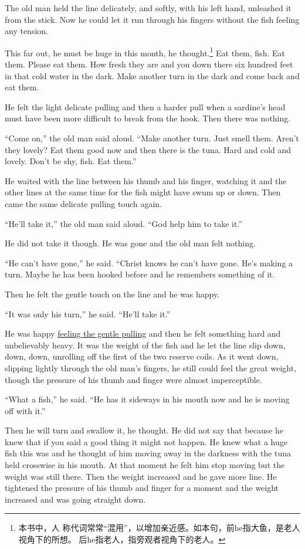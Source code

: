 \documentclass[fontset=ubuntu]{ctexrep}
\begin{document}
The old man held the line delicately, and softly, with his left hand,
\gls{unleashed} it from the stick. Now he could let it run through his
fingers without the fish feeling any \gls{tension}.

This far out, he must be huge in this month, he thought.\footnote{本书中，人
  称代词常常“混用”，以增加亲近感。如本句，前he指大鱼，是老人视角下的所想。
  后he指老人，指旁观者视角下的老人。} Eat them, fish. Eat them. Please eat
them. How fresh they are and you down there six hundred feet in that cold
water in the dark. Make another turn in the dark and come back and eat them.

He felt the light delicate pulling and then a harder pull when a sardine's
head must have been more difficult to break from the hook. Then there was
nothing.

``Come on,'' the old man said aloud. ``Make another turn. Just smell them.
Aren't they lovely? Eat them good now and then there is the tuna. Hard and
cold and lovely. Don't be shy, fish. Eat them.''

He waited with the line between his thumb and his finger, watching it and
the other lines at the same time for the fish might have swum up or down.
Then came the same delicate pulling touch again.

``He'll take it,'' the old man said aloud. ``God help him to take it.''

He did not take it though. He was gone and the old man felt nothing.

``He can't have gone,'' he said. ``\gls{Christ} knows he can't have gone. He's
making a turn. Maybe he has been hooked before and he remembers something of
it.

Then he felt the \gls{gentle} touch on the line and he was happy.

``It was only his turn,'' he said. ``He'll take it.''

He was happy \uline{feeling the gentle pulling} and then he felt something hard
and unbelievably heavy. It was the weight of the fish and he let the line
\gls{slip} down, down, down, \gls{unrolling} off the first of the two
\gls{reserve} coils. As it went down, slipping lightly through the old man's
fingers, he still could feel the great weight, though the \gls{pressure} of
his thumb and finger were almost \gls{imperceptible}.

``What a fish,'' he said. ``He has it \gls{sideways} in his mouth now and he is moving off with it.''

Then he will turn and \gls{swallow} it, he thought. He did not say that
because he knew that if you said a good thing it might not happen. He knew
what a huge fish this was and he thought of him moving away in the darkness
with the tuna held \gls{crosswise} in his mouth. At that moment he felt him
stop moving but the weight was still there. Then the weight increased and he
gave more line. He \gls{tightened} the pressure of his thumb and finger for a
moment and the weight increased and was going straight down.
\end{document}
